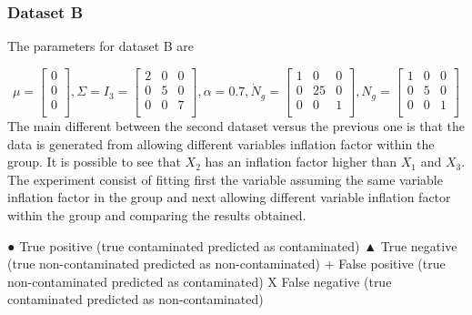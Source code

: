 \documentclass[
]{article}
\begin{document}
\hypertarget{dataset-b}{%
\subsubsection{Dataset B}\label{dataset-b}}

The parameters for dataset B are

\[
\mu = \begin{bmatrix}0 \\0 \\0 \\\end{bmatrix} , \Sigma = I_{3} = \begin{bmatrix}2&0&0 \\0&5&0 \\0&0&7 \\\end{bmatrix}, \alpha = 0.7, \dot{N}_{g} = \begin{bmatrix}1&0&0 \\0&25&0 \\0&0&1 \\\end{bmatrix}, {N}_{g} = \begin{bmatrix}1&0&0 \\0&5&0 \\0&0&1 \\\end{bmatrix}
\] The main different between the second dataset versus the previous one
is that the data is generated from allowing different variables
inflation factor within the group. It is possible to see that \(X_{2}\)
has an inflation factor higher than \(X_{1}\) and \(X_{3}\). The
experiment consist of fitting first the variable assuming the same
variable inflation factor in the group and next allowing different
variable inflation factor within the group and comparing the results
obtained.

{●} True positive (true contaminated predicted as contaminated) {▲} True
negative (true non-contaminated predicted as non-contaminated) {+} False
positive (true non-contaminated predicted as contaminated) {X} False
negative (true contaminated predicted as non-contaminated)
\end{document}
